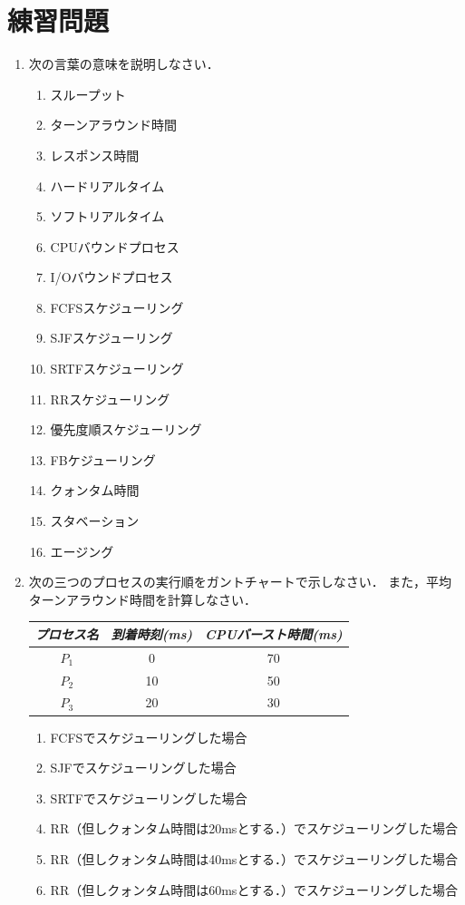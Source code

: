 \section*{練習問題}
\begin{enumerate}
  \renewcommand{\labelenumi}{\ttfamily\arabic{chapter}.\arabic{enumi}}
  \setlength{\leftskip}{1em}
\item 次の言葉の意味を説明しなさい．
  \begin{enumerate}
    \item スループット
    \item ターンアラウンド時間
    \item レスポンス時間
    \item ハードリアルタイム
    \item ソフトリアルタイム
    \item CPUバウンドプロセス
    \item I/Oバウンドプロセス
    \item FCFSスケジューリング
    \item SJFスケジューリング
    \item SRTFスケジューリング
    \item RRスケジューリング
    \item 優先度順スケジューリング
    \item FBケジューリング
    \item クォンタム時間
    \item スタベーション
    \item エージング
  \end{enumerate}
\item 次の三つのプロセスの実行順をガントチャートで示しなさい．
  また，平均ターンアラウンド時間を計算しなさい．
  \begin{center}
    \begin{tabular}{c c c}
      \emph{プロセス名} & \emph{到着時刻(ms)} &
      \emph{CPUバースト時間(ms)} \\\hline
      $P_1$  & 0  & 70 \\
      $P_2$  & 10 & 50 \\
      $P_3$  & 20 & 30
    \end{tabular}
  \end{center}
  \begin{enumerate}
    \item FCFSでスケジューリングした場合
    \item SJFでスケジューリングした場合
    \item SRTFでスケジューリングした場合
    \item RR（但しクォンタム時間は20msとする．）でスケジューリングした場合
    \item RR（但しクォンタム時間は40msとする．）でスケジューリングした場合
    \item RR（但しクォンタム時間は60msとする．）でスケジューリングした場合
  \end{enumerate}
\end{enumerate}


